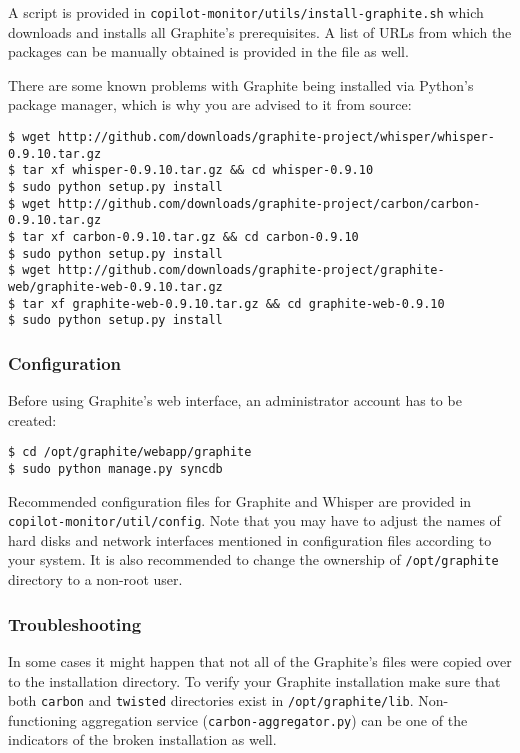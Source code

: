 A script is provided in \texttt{copilot-monitor/utils/install-graphite.sh} which downloads and installs all Graphite's prerequisites.
A list of URLs from which the packages can be manually obtained is provided in the file as well.

There are some known problems with Graphite being installed via Python's package manager, which is why you are advised to it from source:

\lstset{caption=Installing Graphite}
\begin{lstlisting}
$ wget http://github.com/downloads/graphite-project/whisper/whisper-0.9.10.tar.gz
$ tar xf whisper-0.9.10.tar.gz && cd whisper-0.9.10
$ sudo python setup.py install
$ wget http://github.com/downloads/graphite-project/carbon/carbon-0.9.10.tar.gz
$ tar xf carbon-0.9.10.tar.gz && cd carbon-0.9.10
$ sudo python setup.py install
$ wget http://github.com/downloads/graphite-project/graphite-web/graphite-web-0.9.10.tar.gz
$ tar xf graphite-web-0.9.10.tar.gz && cd graphite-web-0.9.10
$ sudo python setup.py install
\end{lstlisting}

\subsubsection{Configuration}
Before using Graphite's web interface, an administrator account has to be created:
\lstset{caption=Creating admin users}
\begin{lstlisting}
$ cd /opt/graphite/webapp/graphite
$ sudo python manage.py syncdb
\end{lstlisting}

Recommended configuration files for Graphite and Whisper are provided in \texttt{copilot-monitor/util/config}. Note that you may have to adjust the names of hard disks and network interfaces mentioned in configuration files according to your system.
It is also recommended to change the ownership of \texttt{/opt/graphite} directory to a non-root user.

\subsubsection{Troubleshooting}
In some cases it might happen that not all of the Graphite's files were copied over to the installation directory.
To verify your Graphite installation make sure that both \texttt{carbon} and \texttt{twisted} directories exist in \texttt{/opt/graphite/lib}.
Non-functioning aggregation service (\texttt{carbon-aggregator.py}) can be one of the indicators of the broken installation as well.

